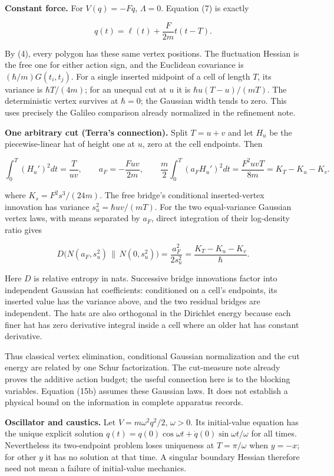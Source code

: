 \documentclass[11pt,a4paper]{article}
\begin{document}
\textbf{Constant force.} For \(V(q)=-Fq\), \(\Lambda=0\). Equation (7)
is exactly

\[q(t)=\ell(t)+\frac{F}{2m}t(t-T).\tag{15}\]

By (4), every polygon has these same vertex positions. The fluctuation
Hessian is the free one for either action sign, and the Euclidean
covariance is \((\hbar/m)G(t_i,t_j)\). For a single inserted midpoint of
a cell of length \(T\), its variance is \(\hbar T/(4m)\); for an unequal
cut at \(u\) it is \(\hbar u(T-u)/(mT)\). The deterministic vertex
survives at \(\hbar=0\); the Gaussian width tends to zero. This uses
precisely the Galileo comparison already normalized in the refinement
note.

\textbf{One arbitrary cut (Terra's connection).} Split \(T=u+v\) and let
\(H_u\) be the piecewise-linear hat of height one at \(u\), zero at the
cell endpoints. Then

\[
 \int_0^T(H_u')^2dt=\frac{T}{uv},\qquad
 a_F=-\frac{Fuv}{2m},\qquad
 \frac m2\int_0^T(a_FH_u')^2dt
       =\frac{F^2uvT}{8m}=K_T-K_u-K_v.
 \tag{15a}
\]

where \(K_s=F^2s^3/(24m)\). The free bridge's conditional
inserted-vertex innovation has variance \(s_u^2=\hbar uv/(mT)\). For the
two equal-variance Gaussian vertex laws, with means separated by
\(a_F\), direct integration of their log-density ratio gives

\[
 D\big(N(a_F,s_u^2)\,\|\,N(0,s_u^2)\big)
       =\frac{a_F^2}{2s_u^2}
       =\frac{K_T-K_u-K_v}{\hbar}.
 \tag{15b}
\]

Here \(D\) is relative entropy in nats. Successive bridge innovations
factor into independent Gaussian hat coefficients: conditioned on a
cell's endpoints, its inserted value has the variance above, and the two
residual bridges are independent. The hats are also orthogonal in the
Dirichlet energy because each finer hat has zero derivative integral
inside a cell where an older hat has constant derivative.

Thus classical vertex elimination, conditional Gaussian normalization
and the cut energy are related by one Schur factorization. The
cut-measure note already proves the additive action budget; the useful
connection here is to the blocking variables. Equation (15b) assumes
these Gaussian laws. It does not establish a physical bound on the
information in complete apparatus records.

\textbf{Oscillator and caustics.} Let \(V=m\omega^2q^2/2\),
\(\omega>0\). Its initial-value equation has the unique explicit
solution \(q(t)=q(0)\cos\omega t+\dot q(0)\sin\omega t/\omega\) for all
times. Nevertheless its two-endpoint problem loses uniqueness at
\(T=\pi/\omega\) when \(y=-x\); for other \(y\) it has no solution at
that time. A singular boundary Hessian therefore need not mean a failure
of initial-value mechanics.
\end{document}
